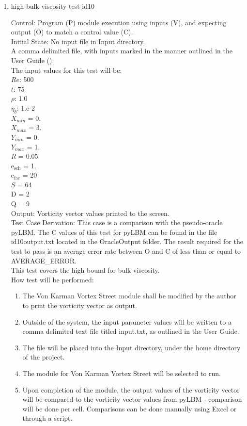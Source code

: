 \documentclass[12pt, titlepage]{article}
\begin{document}
\begin{enumerate}
\item{high-bulk-viscosity-test-id10\\}

Control: Program (P) module execution using inputs (V), and expecting output (O) to match a control value (C).\\
					
Initial State: No input file in Input directory.\\
					
A comma delimited file, with inputs marked in the manner outlined in the User Guide (\citet{LBM_UserGuide_PM}).\\The input values for this test will be:\\
$Re$: 500\\
$t$: 75\\
$\rho$: 1.0\\
$\eta_b$: 1.e-2\\
$X_{min}$ = 0.\\
$X_{max}$ = 3.\\
$Y_{min}$ = 0.\\
$Y_{max}$ = 1.\\
$R$ = 0.05\\
$\mathrm{e_{sch}}$ = 1.\\
$\mathrm{e_{fac}}$ = 20\\
$S$ = 64\\
$\mathrm{D}$ = 2\\
$\mathrm{Q}$ = 9\\

Output: Vorticity vector values printed to the screen. \\ 

Test Case Derivation: This case is a comparison with the pseudo-oracle pyLBM. The C values of this test for pyLBM can be found in the file id10output.txt located in the OracleOutput folder. The result required for the test to pass is an average error rate between O and C of less than or equal to AVERAGE\_ERROR.\\
This test covers the high bound for bulk viscosity.\\

					
How test will be performed: 

\begin{enumerate}
\item The Von Karman Vortex Street module shall be modified by the author to print the vorticity vector as output.
\item Outside of the system, the input parameter values will be written to a comma delimited text file titled input.txt, as outlined in the User Guide.
\item The file will be placed into the Input directory, under the home directory of the project.
\item The module for Von Karman Vortex Street will be selected to run.
\item Upon completion of the module, the output values of the vorticity vector will be compared to the vorticity vector values from pyLBM - comparison will be done per cell. Comparisons can be done manually using Excel or through a script.\\
\end{enumerate}


\end{enumerate}
\end{document}
